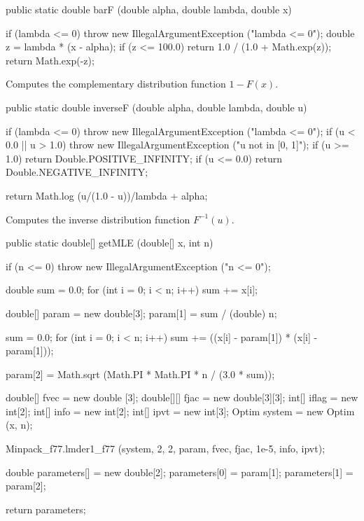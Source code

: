 \begin{code}

   public static double barF (double alpha, double lambda, double x)\begin{hide} {
      if (lambda <= 0)
        throw new IllegalArgumentException ("lambda <= 0");
      double z = lambda * (x - alpha);
      if (z <= 100.0)
         return 1.0 / (1.0 + Math.exp(z));
      return Math.exp(-z);
   }\end{hide}
\end{code}
  \begin{tabb}
  Computes  the complementary distribution function $1-F(x)$.
 \end{tabb}
\begin{code}

   public static double inverseF (double alpha, double lambda, double u)\begin{hide} {
        if (lambda <= 0)
           throw new IllegalArgumentException ("lambda <= 0");
        if (u < 0.0 || u > 1.0)
           throw new IllegalArgumentException ("u not in [0, 1]");
        if (u >= 1.0)
            return Double.POSITIVE_INFINITY;
        if (u <= 0.0)
            return Double.NEGATIVE_INFINITY;

        return Math.log (u/(1.0 - u))/lambda + alpha;
   }\end{hide}
\end{code}
  \begin{tabb}
  Computes the inverse distribution function $F^{-1}(u)$.
 \end{tabb}
\begin{code}

   public static double[] getMLE (double[] x, int n)\begin{hide} {
      if (n <= 0)
         throw new IllegalArgumentException ("n <= 0");

      double sum = 0.0;
      for (int i = 0; i < n; i++)
         sum += x[i];

      double[] param = new double[3];
      param[1] = sum / (double) n;

      sum = 0.0;
      for (int i = 0; i < n; i++)
         sum += ((x[i] - param[1]) * (x[i] - param[1]));

      param[2] = Math.sqrt (Math.PI * Math.PI * n / (3.0 * sum));

      double[] fvec = new double [3];
      double[][] fjac = new double[3][3];
      int[] iflag = new int[2];
      int[] info = new int[2];
      int[] ipvt = new int[3];
      Optim system = new Optim (x, n);

      Minpack_f77.lmder1_f77 (system, 2, 2, param, fvec, fjac, 1e-5, info, ipvt);

      double parameters[] = new double[2];
      parameters[0] = param[1];
      parameters[1] = param[2];

      return parameters;
   }\end{hide}
\end{code}
